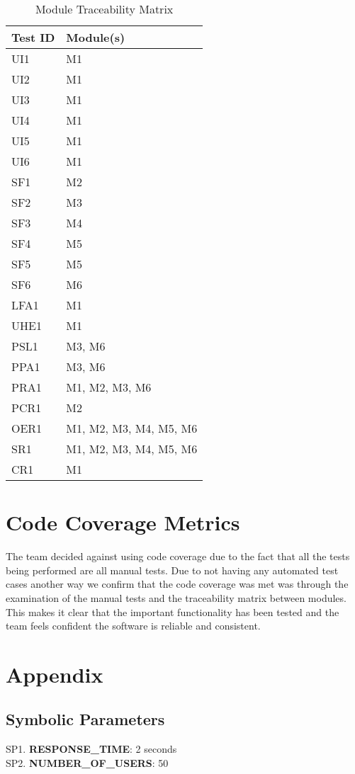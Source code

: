 \documentclass[12pt, titlepage]{article}
\begin{document}
\begin{table}[H]
\caption{Module Traceability Matrix}
\begin{center}
\begin{tabular}{ |m{8em}|m{12em}|} 
 \hline
 Test ID & Module(s) \\ 
 \hline
 UI1 & M1\\
 \hline
 UI2 & M1\\ 
 \hline
 UI3 & M1\\
 \hline 
 UI4 & M1\\
 \hline
 UI5 & M1\\
 \hline
 UI6 & M1\\
 \hline
 SF1 & M2\\
 \hline
 SF2 & M3\\
 \hline
 SF3 & M4\\
 \hline
 SF4 & M5\\
 \hline
 SF5 & M5\\
 \hline
 SF6 & M6\\
 \hline
 LFA1 & M1\\
 \hline
 UHE1 & M1\\
 \hline 
 PSL1 & M3, M6\\
 \hline
 PPA1 & M3, M6\\
 \hline
 PRA1 & M1, M2, M3, M6\\
 \hline
 PCR1 & M2\\
 \hline
 OER1 & M1, M2, M3, M4, M5, M6\\
 \hline
 SR1 & M1, M2, M3, M4, M5, M6\\
 \hline
 CR1 & M1\\
 \hline
\end{tabular}
\end{center}
\label{traceabilityFuncModule}
\end{table}

\section{Code Coverage Metrics}

The team decided against using code coverage due to the fact that all the tests being performed are all manual tests. Due to not having any automated test cases another way we confirm that the code coverage was met was through the examination of the manual tests and the traceability matrix between modules. This makes it clear that the important functionality has been tested and the team feels confident the software is reliable and consistent. 

\section{Appendix}

\subsection{Symbolic Parameters}

SP1. \textbf{RESPONSE\_TIME}: 2 seconds\\
SP2. \textbf{NUMBER\_OF\_USERS}: 50
\end{document}
